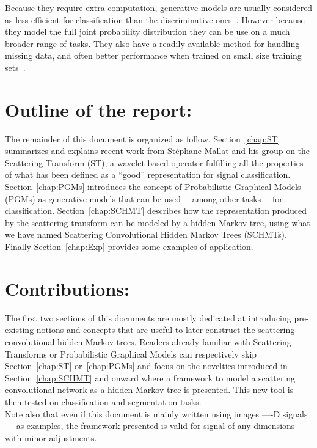 \documentclass[a4paper,11pt]{report}
\begin{document}
		Because they require extra computation, generative models are usually considered as less efficient for classification than the discriminative ones~\citep{ulusoy2005generative}. However because they model the full joint probability distribution they can be use on a much broader range of tasks. They also have a readily available method for handling missing data, and often better performance when trained on small size training sets~\citep{jordan2002discriminative}.
		
	\section{Outline of the report:}
    \label{sec:Intro/Outline of the report}    
    
    The remainder of this document is organized as follow. Section~\ref{chap:ST} summarizes and explains recent work from St\'ephane Mallat and his group on the Scattering Transform (ST), a wavelet-based operator fulfilling all the properties of what has been defined as a ``good'' representation for signal classification. Section~\ref{chap:PGMs} introduces the concept of Probabilistic Graphical Models (PGMs) as generative models that can be used ---among other tasks--- for classification. Section~\ref{chap:SCHMT} describes how the representation produced by the scattering transform can be modeled by a hidden Markov tree, using what we have named Scattering Convolutional Hidden Markov Trees (SCHMTs). Finally Section~\ref{chap:Exp} provides some examples of application.
        
	\section{Contributions:}
    \label{sec:Intro/Contrib}    
    
    The first two sections of this documents are mostly dedicated at introducing pre-existing notions and concepts that are useful to later construct the scattering convolutional hidden Markov trees. Readers already familiar with Scattering Transforms or Probabilistic Graphical Models can respectively skip Section~\ref{chap:ST} or~\ref{chap:PGMs} and focus on the novelties introduced in Section~\ref{chap:SCHMT} and onward where a framework to model a scattering convolutional network as a hidden Markov tree is presented. This new tool is then tested on classification and segmentation tasks.\\
    
    Note also that even if this document is mainly written using images ----D signals--- as examples, the framework presented is valid for signal of any dimensions with minor adjustments.
\end{document}
